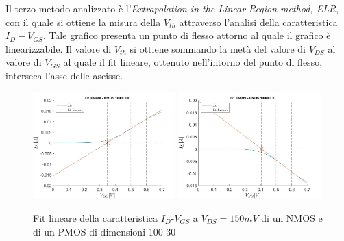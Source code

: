 \documentclass[12pt, letterpaper]{book}
\begin{document}
Il
terzo metodo analizzato è l'\emph{Extrapolation in the Linear Region method, ELR}, con il quale si ottiene la misura della $V_{th}$ attraverso l'analisi della caratteristica $I_D-V_{GS}$.  Tale grafico presenta un punto di flesso attorno al quale il grafico è linearizzabile. Il valore di $V_{th}$ si ottiene sommando la metà del valore di $V_{DS}$ al valore di $V_{GS}$ al quale il fit lineare, ottenuto nell'intorno del punto di flesso, interseca l'asse delle ascisse.\\


\begin{figure}[h!]
  \centering
  \includegraphics[width=0.49\textwidth]{LinearFit-N4-100-30}
  \includegraphics[width=0.49\textwidth]{LinearFit-P1-100-30}
  \caption{Fit lineare della caratteristica  $I_D$-$V_{GS}$ a $V_{DS}=150mV$ di un NMOS e di un PMOS di dimensioni 100-30 }
\end{figure}
\end{document}
